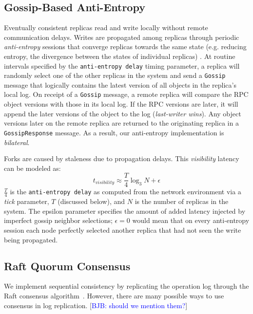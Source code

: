 \documentclass[10pt,conference,letterpaper]{IEEEtran}
\newcommand{\blue}[1]{{\textcolor{blue}{#1}}}
\newcommand{\bjb}[1]{[\blue{BJB: #1}]}
\begin{document}
\subsection{Gossip-Based Anti-Entropy}

Eventually consistent replicas  read and write locally without remote communication delays.
Writes are propagated among replicas through
periodic \textit{anti-entropy} sessions that
converge replicas towards the same state (e.g.
reducing entropy, the divergence between the states of individual replicas)
\cite{kempe_gossip-based_2003}.
At routine intervals specified by the \texttt{anti-entropy delay} timing parameter, a
replica will randomly select one of the other replicas in the system and send a
\texttt{Gossip} message that logically contains the latest version of all objects in the replica's
local log.
On receipt of a \texttt{Gossip} message, a remote replica will compare the RPC object
versions with those in its local log.
If the RPC versions are later, it will append the later versions of the object to the log
(\textit{last-writer wins}).
Any object versions later on the remote replica are returned to the
originating replica in a \texttt{GossipResponse} message.
As a result, our anti-entropy implementation is \textit{bilateral}.

Forks are caused by staleness due to propagation delays.
This \emph{visibility} latency can be modeled as:
\begin{equation}
t_{visibility} \approx \frac{T}{4} \log_3N + \epsilon
\end{equation}
$\frac{T}{4}$ is the
\texttt{anti-entropy delay} as computed from the network environment via a \emph{tick}
parameter, $T$ (discussed below), and $N$ is the number of replicas in the system.
The epsilon parameter specifies the amount of added latency injected by imperfect gossip
neighbor selections; $\epsilon = 0$ would mean that on every anti-entropy session
each node perfectly selected another replica that had not seen the write being propagated.

\subsection{Raft Quorum Consensus}

We implement sequential consistency by replicating the operation log through the Raft
consensus algorithm~\cite{ongaro_search_2014}.
However, there are many possible ways to use consensus in log replication. \bjb{should we mention them?}
\end{document}
